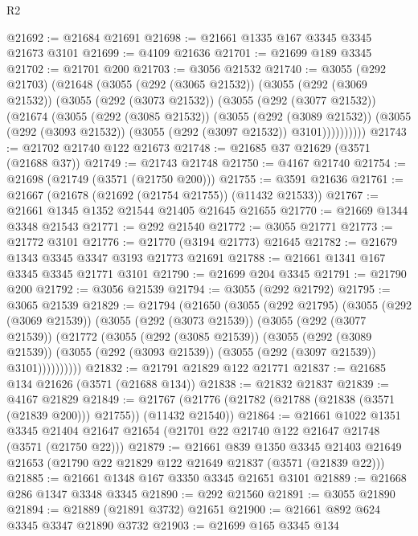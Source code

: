 \begin{lexlean}{R2}
\begin{coremodule}
@21692 := @21684 @21691
@21698 := @21661 @1335 @167 @3345 @3345 @21673 @3101
@21699 := @4109 @21636
@21701 := @21699 @189 @3345
@21702 := @21701 @200
@21703 := @3056 @21532
@21740 := @3055
    (@292 @21703)
    (@21648
      (@3055
        (@292 (@3065 @21532))
        (@3055
          (@292 (@3069 @21532))
          (@3055
            (@292 (@3073 @21532))
            (@3055
              (@292 (@3077 @21532))
              (@21674
                (@3055
                  (@292 (@3085 @21532))
                  (@3055
                    (@292 (@3089 @21532))
                    (@3055 (@292 (@3093 @21532)) (@3055 (@292 (@3097 @21532)) @3101))))))))))
@21743 := @21702 @21740 @122 @21673
@21748 := @21685 @37 @21629 (@3571 (@21688 @37))
@21749 := @21743 @21748
@21750 := @4167 @21740
@21754 := @21698 (@21749 (@3571 (@21750 @200)))
@21755 := @3591 @21636
@21761 := @21667 (@21678 (@21692 (@21754 @21755)) (@11432 @21533))
@21767 := @21661 @1345 @1352 @21544 @21405 @21645 @21655
@21770 := @21669 @1344 @3348 @21543
@21771 := @292 @21540
@21772 := @3055 @21771
@21773 := @21772 @3101
@21776 := @21770 (@3194 @21773) @21645
@21782 := @21679 @1343 @3345 @3347 @3193 @21773 @21691
@21788 := @21661 @1341 @167 @3345 @3345 @21771 @3101
@21790 := @21699 @204 @3345
@21791 := @21790 @200
@21792 := @3056 @21539
@21794 := @3055 (@292 @21792)
@21795 := @3065 @21539
@21829 := @21794
    (@21650
      (@3055
        (@292 @21795)
        (@3055
          (@292 (@3069 @21539))
          (@3055
            (@292 (@3073 @21539))
            (@3055
              (@292 (@3077 @21539))
              (@21772
                (@3055
                  (@292 (@3085 @21539))
                  (@3055
                    (@292 (@3089 @21539))
                    (@3055 (@292 (@3093 @21539)) (@3055 (@292 (@3097 @21539)) @3101))))))))))
@21832 := @21791 @21829 @122 @21771
@21837 := @21685 @134 @21626 (@3571 (@21688 @134))
@21838 := @21832 @21837
@21839 := @4167 @21829
@21849 := @21767 (@21776 (@21782 (@21788 (@21838 (@3571 (@21839 @200))) @21755)) (@11432 @21540))
@21864 := @21661
    @1022
    @1351
    @3345
    @21404
    @21647
    @21654
    (@21701 @22 @21740 @122 @21647 @21748 (@3571 (@21750 @22)))
@21879 := @21661
    @839
    @1350
    @3345
    @21403
    @21649
    @21653
    (@21790 @22 @21829 @122 @21649 @21837 (@3571 (@21839 @22)))
@21885 := @21661 @1348 @167 @3350 @3345 @21651 @3101
@21889 := @21668 @286 @1347 @3348 @3345
@21890 := @292 @21560
@21891 := @3055 @21890
@21894 := @21889 (@21891 @3732) @21651
@21900 := @21661 @892 @624 @3345 @3347 @21890 @3732
@21903 := @21699 @165 @3345 @134

\end{coremodule}
\end{lexlean}

